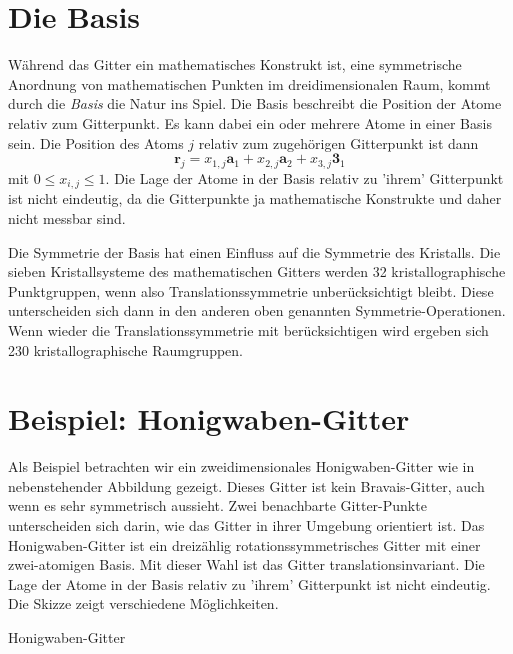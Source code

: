 \section{Die Basis}


Während das Gitter ein mathematisches Konstrukt ist, eine symmetrische Anordnung von mathematischen Punkten im dreidimensionalen Raum, kommt durch die \emph{Basis} die Natur ins Spiel. Die Basis beschreibt die Position der Atome relativ zum Gitterpunkt. Es kann dabei ein oder mehrere Atome in einer Basis sein. Die Position des Atoms $j$ relativ zum zugehörigen Gitterpunkt ist dann 
\begin{equation}
 \mathbf{r}_j = x_{1,j} \mathbf{a}_1 + x_{2,j} \mathbf{a}_2 + x_{3,j} \mathbf{3}_1  
\end{equation}
mit $0 \le x_{i,j} \le 1$. Die Lage der Atome in der Basis relativ zu 'ihrem' Gitterpunkt ist nicht eindeutig, da die Gitterpunkte ja mathematische Konstrukte und daher nicht messbar sind.


Die Symmetrie der Basis hat einen Einfluss auf die Symmetrie des Kristalls. Die sieben Kristallsysteme des mathematischen Gitters werden 32 kristallographische Punktgruppen, wenn also Translationssymmetrie unberücksichtigt bleibt. Diese unterscheiden sich dann in den anderen oben genannten Symmetrie-Operationen.
Wenn wieder die Translationssymmetrie mit berücksichtigen wird ergeben sich 230 kristallographische Raumgruppen.


\section{Beispiel: Honigwaben-Gitter}

Als Beispiel betrachten wir ein zweidimensionales Honigwaben-Gitter wie in nebenstehender Abbildung gezeigt. Dieses Gitter ist kein Bravais-Gitter, auch wenn es sehr symmetrisch aussieht. Zwei benachbarte Gitter-Punkte unterscheiden sich darin, wie das Gitter in ihrer Umgebung orientiert ist. Das  Honigwaben-Gitter ist ein dreizählig rotationssymmetrisches Gitter mit einer zwei-atomigen Basis. Mit dieser Wahl ist das Gitter translationsinvariant. Die Lage der Atome in der Basis relativ zu 'ihrem' Gitterpunkt ist nicht eindeutig. Die Skizze zeigt verschiedene Möglichkeiten.



\begin{marginfigure}

\caption{Honigwaben-Gitter}
\end{marginfigure}


